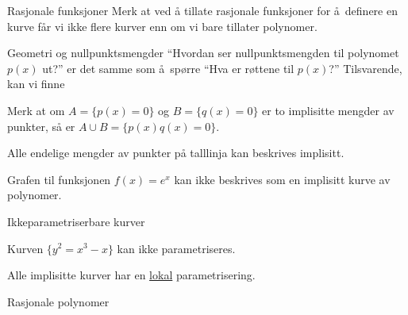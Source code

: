 \documentclass[norsk]{beamer}
\begin{document}
\begin{frame}{Rasjonale funksjoner}
    Merk at ved å tillate rasjonale funksjoner for å definere en kurve
    får vi ikke flere kurver enn om vi bare tillater polynomer.
\end{frame}

\begin{frame}{Geometri og nullpunktsmengder}
    ``Hvordan ser nullpunktsmengden til polynomet $p(x)$ ut?''
    er det samme som å spørre ``Hva er røttene til $p(x)$?''
    Tilsvarende, kan vi finne
    \begin{example}
        Merk at om $A = \{ p(x) = 0 \}$
        og $B = \{ q(x) = 0\}$
        er to implisitte mengder av punkter,
        så er $A\cup B = \{ p(x) q(x) = 0 \}$.
    \end{example}
    \begin{corollary}
        Alle endelige mengder av punkter på talllinja kan
        beskrives implisitt.
    \end{corollary}
    \begin{example}
        Grafen til funksjonen $f(x) = e^x$ kan ikke beskrives
        som en implisitt kurve av polynomer.
    \end{example}
\end{frame}

\begin{frame}{Ikkeparametriserbare kurver}
    \begin{example}
        Kurven $\{ y^2 = x^3 - x\}$ kan ikke parametriseres.
    \end{example}
    \begin{theorem}
        Alle implisitte kurver har en \underline{lokal}
        parametrisering.
    \end{theorem}
\end{frame}

\begin{frame}{Rasjonale polynomer}
\end{frame}
\end{document}
